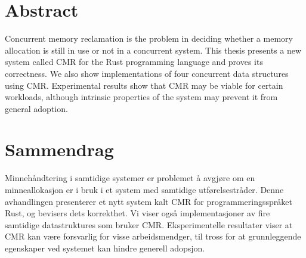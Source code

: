 \par\break\null%
\vsize%
{\centering\section*{Abstract}}

Concurrent memory reclamation is the problem in deciding whether a memory allocation is still in
use or not in a concurrent system.  This thesis presents a new system called CMR for the Rust
programming language and proves its correctness.  We also show implementations of four concurrent
data structures using CMR\@.  Experimental results show that CMR may be viable for certain
workloads, although intrinsic properties of the system may prevent it from general adoption.


\vfill%
{\centering\section*{Sammendrag}}

Minnehåndtering i samtidige systemer er problemet å avgjøre om en minneallokasjon er i bruk i et
system med samtidige utførelsestråder. Denne avhandlingen presenterer et nytt system kalt CMR for
programmeringsspråket Rust, og bevisers dets korrekthet. Vi viser også implementasjoner av fire
samtidige datastruktures som bruker CMR\@. Eksperimentelle resultater viser at CMR kan være
forsvarlig for visse arbeidsmendger, til tross for at grunnleggende egenskaper ved systemet kan
hindre generell adopsjon.

\vfill\break%
